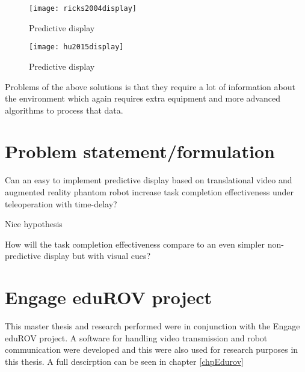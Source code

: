 \begin{figure}[h!]
    \centering
    \texttt{[image: ricks2004display]}
    \caption{Predictive display \citep{Ricks2004}}
    \label{figRicks2004}
\end{figure}

\begin{figure}[h!]
    \centering
    \texttt{[image: hu2015display]}
    \caption{Predictive display \citep{Hu2015}}
\end{figure}

Problems of the above solutions is that they require a lot of information about the environment which again requires extra equipment and more advanced algorithms to process that data.

\section{Problem statement/formulation}

Can an easy to implement predictive display based on translational video and augmented reality phantom robot increase task completion effectiveness under teleoperation with time-delay?

\citep{Lu2018} Nice hypothesis

How will the task completion effectiveness compare to an even simpler non-predictive display but with visual cues?

\section{Engage eduROV project}

This master thesis and research performed were in conjunction with the Engage eduROV project. A software for handling video transmission and robot communication were developed and this were also used for research purposes in this thesis. A full descirption can be seen in chapter \ref{chpEdurov}